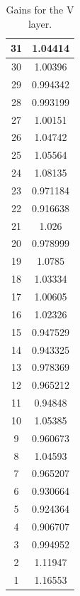 \begin{table}[h]
\begin{subtable}[h]{2in}
{\begin{tabular}{|c|c|}
31   &   1.04414  \\  \hline  
30   &   1.00396  \\  \hline  
29   &   0.994342  \\  \hline  
28   &   0.993199  \\  \hline  
27   &   1.00151  \\  \hline  
26   &   1.04742  \\  \hline  
25   &   1.05564  \\  \hline  
24   &   1.08135  \\  \hline  
23   &   0.971184  \\  \hline  
22   &   0.916638  \\  \hline  
21   &   1.026  \\  \hline  
20   &   0.978999  \\  \hline  
19   &   1.0785  \\  \hline  
18   &   1.03334  \\  \hline  
17   &   1.00605  \\  \hline  
16   &   1.02326  \\  \hline  
15   &   0.947529  \\  \hline  
14   &   0.943325  \\  \hline  
13   &   0.978369  \\  \hline  
12   &   0.965212  \\  \hline  
11   &   0.94848  \\  \hline  
10   &   1.05385  \\  \hline  
9   &   0.960673  \\  \hline  
8   &   1.04593  \\  \hline  
7   &   0.965207  \\  \hline  
6   &   0.930664  \\  \hline  
5   &   0.924364  \\  \hline  
4   &   0.906707  \\  \hline  
3   &   0.994952  \\  \hline  
2   &   1.11947  \\  \hline  
1   &   1.16553  \\  \hline  
        \end{tabular}
        }
        \caption{Gains for the V layer.}
    \end{subtable}
    \quad
    \begin{subtable}[h]{2in}
        \centering{}
\end{subtable}
\end{table}

